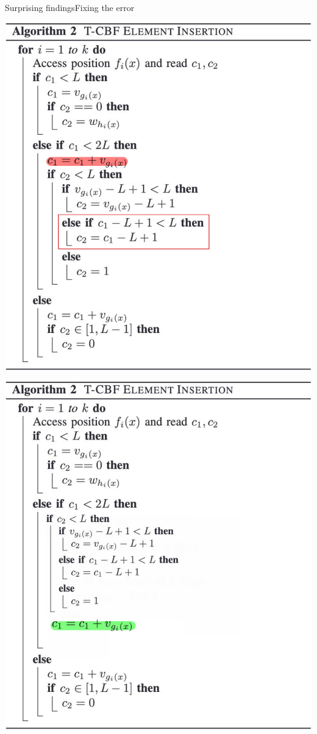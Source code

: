 \documentclass[
  english,            %
  aspectratio=169,    %
]{tumbeamer}
\begin{document}
\begin{frame}{Surprising findings}{Fixing the error}
  \begin{minipage}{0.38\textwidth}
    \centering
    \includegraphics[width=\linewidth]{img/tbf_insertion_pseudo_mark.pdf}
  \end{minipage}
  \hspace{0.1\textwidth} 
  \begin{minipage}{0.38\textwidth}
    \centering
    \includegraphics[width=\linewidth]{img/tbf_insertion_pseudo_fix_mark.pdf}

\end{minipage}
\end{frame}
\end{document}
